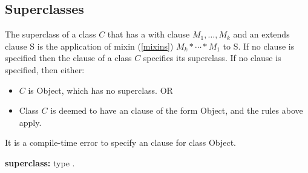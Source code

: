 \documentclass{article}
\newcommand{\code}[1]{{\sf #1}}
\begin{document}



\subsection{Superclasses}

\LMHash{}
The superclass of a class $C$ that has a with clause \code{\WITH{} $M_1, \ldots, M_k$} and an extends clause \code{\EXTENDS{} S} is the application of mixin (\ref{mixins}) $M_k* \cdots * M_1$  to S.  If no \WITH{} clause is specified then  the \EXTENDS{} clause of a class $C$ specifies its superclass. If no \EXTENDS{} clause is specified, then either:
\begin{itemize}
\item $C$ is \code{Object}, which has no superclass. OR
\item Class $C$ is  deemed to have an \EXTENDS{} clause of the form \code{\EXTENDS{} Object}, and the rules above apply.
\end{itemize}

\LMHash{}
It is a compile-time error to specify an \EXTENDS{} clause for class \code{Object}.

\begin{grammar}
{\bf superclass:}
      \EXTENDS{} type
    .
\end{grammar}
\end{document}
